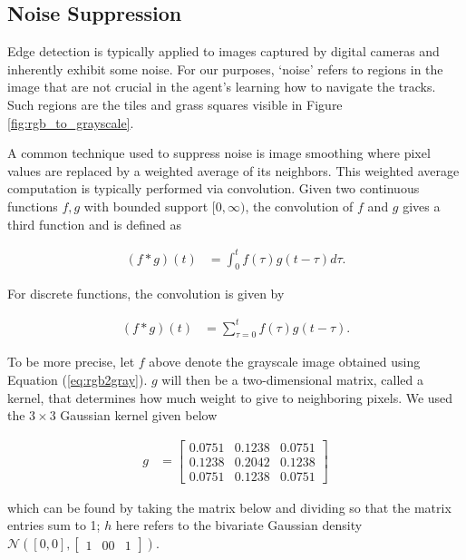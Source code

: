 \subsection{Noise Suppression}
Edge detection is typically applied to images captured by digital cameras
and inherently exhibit some noise. For our purposes, `noise' refers to
regions in the image that are not crucial in the agent's learning how
to navigate the tracks. Such regions are the tiles and grass squares
visible in Figure \ref{fig:rgb_to_grayscale}.

A common technique used to 
suppress noise is image smoothing where pixel values are replaced
by a weighted average of its neighbors. This weighted average computation
is typically performed via convolution. Given two continuous functions 
$f,g$ with bounded support $[0, \infty)$, the convolution of $f$ and $g$
gives a third function and is defined as

\begin{align}\label{eq:cont_conv}
(f*g)(t) &= \int_0^t f(\tau)g(t-\tau)d\tau.
\end{align}

For discrete functions, the convolution is given by

\begin{align}\label{eq:disc_conv}
(f*g)(t) &= \sum_{\tau=0}^t f(\tau)g(t-\tau).
\end{align}

\par
To be more precise, let $f$ above denote the grayscale image obtained
using Equation (\ref{eq:rgb2gray}). $g$ will then be a two-dimensional matrix,
called a kernel, that determines how much weight to give to neighboring
pixels. We used the $3\times 3$ Gaussian kernel given below

\begin{align*}
g &=
\begin{bmatrix}
0.0751 & 0.1238 & 0.0751 \\
0.1238 & 0.2042 & 0.1238 \\
0.0751 & 0.1238 & 0.0751
\end{bmatrix}
\end{align*}

which can be found by taking the matrix below and dividing so that the
matrix entries sum to 1; $h$ here refers to the 
bivariate Gaussian density 
$\mathcal{N}\left([0,0],\begin{bmatrix} 1 & 0  0 & 1 \end{bmatrix}\right)$.

